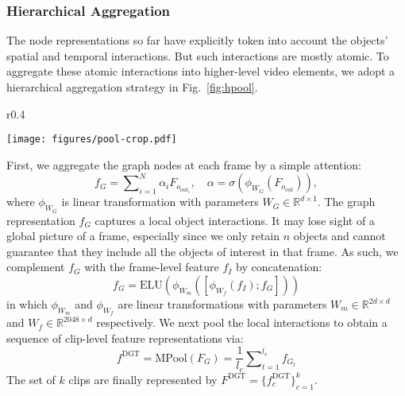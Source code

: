 \documentclass[runningheads]{llncs}
\begin{document}
\subsubsection{Hierarchical Aggregation}
The node representations so far have explicitly token into account the objects' spatial and temporal interactions. But 
such interactions are mostly atomic. To aggregate these
atomic interactions into higher-level
video elements, we adopt a hierarchical aggregation strategy in Fig.~\ref{fig:hpool}. 
\begin{wrapfigure}[7]{r}{0.4\textwidth}
 \vspace{-32pt}
  \begin{center}
    \texttt{[image: figures/pool-crop.pdf]}
  \end{center}
   \vspace{-20pt}
  \caption{Hierarchical Aggregation.}
  \label{fig:hpool}
\end{wrapfigure}
First, we aggregate the graph nodes at each frame by a simple attention:
\begin{equation}
   f_G = \sum\nolimits_{i=1}^N \alpha_i F_{o_{out_i}}, \quad  \alpha = \sigma(\phi_{W_G}(F_{o_{out}})),
\end{equation}
where $\phi_{W_G}$ is linear transformation with parameters $W_G \in \mathbb{R}^{d \times 1}$.
The graph representation $f_G$ captures a local object interactions. It may lose sight of a global picture of a frame, especially 
since we only retain $n$ objects and cannot guarantee that they include all the objects of interest in that frame. As such, we complement $f_G$ with the frame-level feature $f_I$ by concatenation:
\begin{equation}
\label{equ:ff}
    f_G = \text{ELU}(\phi_{W_m}([\phi_{W_f}(f_I);f_G]))
\end{equation}
in which $\phi_{W_m}$ and $\phi_{W_f}$ are linear transformations with parameters $W_m\in\mathbb{R}^{2d \times d}$ and $W_f\in\mathbb{R}^{2048\times d}$ respectively.
We next pool the local interactions to obtain a sequence of clip-level feature representations via:
\begin{equation}
\label{equ:fc}
 f^{\text{DGT}}=\text{MPool}(F_G)=\frac{1}{l_c}\sum\nolimits_{t=1}^{l_v} f_{G_t}
\end{equation}
\noindent The set of $k$ clips are finally represented by  $F^{\text{DGT}}\!=\!\{f_c^{\text{DGT}}\}_{c=1}^k$. 
\end{document}
